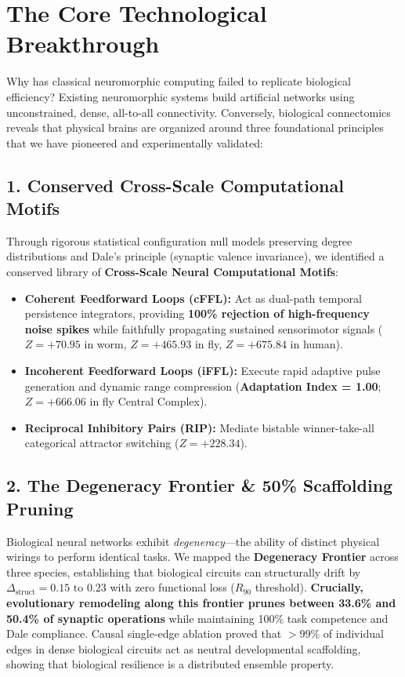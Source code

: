\documentclass[11pt,letterpaper]{article}
\begin{document}
\section{The Core Technological Breakthrough}

Why has classical neuromorphic computing failed to replicate biological efficiency? Existing neuromorphic systems build artificial networks using unconstrained, dense, all-to-all connectivity. Conversely, biological connectomics reveals that physical brains are organized around three foundational principles that we have pioneered and experimentally validated:

\subsection{1. Conserved Cross-Scale Computational Motifs}
Through rigorous statistical configuration null models preserving degree distributions and Dale's principle (synaptic valence invariance), we identified a conserved library of \textbf{Cross-Scale Neural Computational Motifs}:
\begin{itemize}[leftmargin=*]
    \item \textbf{Coherent Feedforward Loops (cFFL):} Act as dual-path temporal persistence integrators, providing \textbf{100\% rejection of high-frequency noise spikes} while faithfully propagating sustained sensorimotor signals ($Z = +70.95$ in worm, $Z = +465.93$ in fly, $Z = +675.84$ in human).
    \item \textbf{Incoherent Feedforward Loops (iFFL):} Execute rapid adaptive pulse generation and dynamic range compression (\textbf{Adaptation Index = 1.00}; $Z = +666.06$ in fly Central Complex).
    \item \textbf{Reciprocal Inhibitory Pairs (RIP):} Mediate bistable winner-take-all categorical attractor switching ($Z = +228.34$).
\end{itemize}

\subsection{2. The Degeneracy Frontier \& 50\% Scaffolding Pruning}
Biological neural networks exhibit \textit{degeneracy}---the ability of distinct physical wirings to perform identical tasks. We mapped the \textbf{Degeneracy Frontier} across three species, establishing that biological circuits can structurally drift by $\Delta_{\mathrm{struct}} = 0.15\text{ to }0.23$ with zero functional loss ($R_{90}$ threshold). 
\textbf{Crucially, evolutionary remodeling along this frontier prunes between 33.6\% and 50.4\% of synaptic operations} while maintaining 100\% task competence and Dale compliance. Causal single-edge ablation proved that $>99\%$ of individual edges in dense biological circuits act as neutral developmental scaffolding, showing that biological resilience is a distributed ensemble property.
\end{document}
